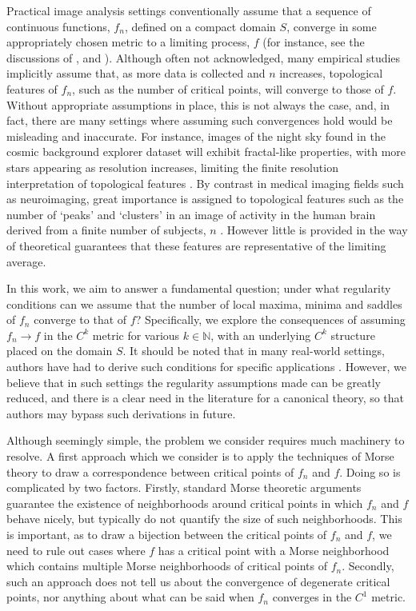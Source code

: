 \documentclass[11pt]{article}
\newcommand{\1}{\mathbf{1}}
\theoremstyle{definition}
\theoremstyle{remark}
\begin{document}
Practical image analysis settings conventionally assume that a sequence of continuous functions, $f_n$, defined on a compact domain $S$, converge in some appropriately chosen metric to a limiting process, $f$ (for instance, see the discussions of \cite{adler1981geometry}, \cite{Cheng2017} and \cite{davenport2022confidenceregionslocationpeaks}). Although often not acknowledged, many empirical studies  implicitly assume that, as more data is collected and $n$ increases, topological features of $f_n$, such as the number of critical points, will converge to those of $f$. Without appropriate assumptions in place, this is not always the case, and, in fact, there are many settings where assuming such convergences hold would be misleading and inaccurate. For instance, images of the night sky found in the cosmic background explorer dataset will exhibit fractal-like properties, with more stars appearing as resolution increases,  limiting the finite resolution interpretation of topological features \citep{COLEMAN1992,Pino1995}. By contrast in medical imaging fields such as neuroimaging, great importance is assigned to topological features such as the number of `peaks' and `clusters' in an image of activity in the human brain derived from a finite number of subjects, $n$ \cite{Friston1994, Chumbley2010, maullin2023spatial}. However little is provided in the way of theoretical guarantees that these features are representative of the limiting average. 

In this work, we aim to answer a fundamental question; under what regularity conditions can we assume that the number of local maxima, minima and saddles of $f_n$ converge to that of $f$? Specifically, we explore the consequences of assuming $f_n\rightarrow f$ in the $C^k$ metric for various $k\in \mathbb{N}$, with an underlying $C^k$ structure placed on the domain $S$. It should be noted that in many real-world settings, authors have had to derive such conditions for specific applications \citep{Adler2009, Cheng2017, Eldar2024}. However, we believe that in such settings the regularity assumptions made can be greatly reduced, and there is a clear need in the literature for a canonical theory, so that authors may bypass such derivations in future.

Although seemingly simple, the problem we consider requires much machinery to resolve. A first approach which we consider is to apply the techniques of Morse theory to draw a correspondence between critical points of $f_n$ and $f$. Doing so is complicated by two factors. Firstly, standard Morse theoretic arguments guarantee the existence of neighborhoods around critical points in which $f_n$ and $f$ behave nicely, but typically do not quantify the size of such neighborhoods. This is important, as to draw a bijection between the critical points of $f_n$ and $f$, we need to rule out cases where $f$ has a critical point with a Morse neighborhood which contains multiple Morse neighborhoods of critical points of $f_n$. Secondly, such an approach does not tell us about the convergence of degenerate critical points, nor anything about what can be said when $f_n$ converges in the $C^1$ metric.
\end{document}
